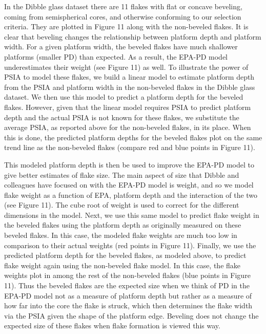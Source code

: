 \documentclass[10pt,letterpaper]{article}
\begin{document}
In the Dibble glass dataset there are 11 flakes with flat or concave
beveling, coming from semispherical cores, and otherwise conforming to
our selection criteria. They are plotted in Figure 11 along with the
non-beveled flakes. It is clear that beveling changes the relationship
between platform depth and platform width. For a given platform width,
the beveled flakes have much shallower platforms (smaller PD) than
expected. As a result, the EPA-PD model underestimates their weight (see
Figure 11) as well. To illustrate the power of PSIA to model these
flakes, we build a linear model to estimate platform depth from the PSIA
and platform width in the non-beveled flakes in the Dibble glass
dataset. We then use this model to predict a platform depth for the
beveled flakes. However, given that the linear model requires PSIA to
predict platform depth and the actual PSIA is not known for these
flakes, we substitute the average PSIA, as reported above for the
non-beveled flakes, in its place. When this is done, the predicted
platform depths for the beveled flakes plot on the same trend line as
the non-beveled flakes (compare red and blue points in Figure 11).

This modeled platform depth is then be used to improve the EPA-PD model
to give better estimates of flake size. The main aspect of size that
Dibble and colleagues have focused on with the EPA-PD model is weight,
and so we model flake weight as a function of EPA, platform depth and
the interaction of the two (see Figure 11). The cube root of weight is
used to correct for the different dimensions in the model. Next, we use
this same model to predict flake weight in the beveled flakes using the
platform depth as originally measured on these beveled flakes. In this
case, the modeled flake weights are much too low in comparison to their
actual weights (red points in Figure 11). Finally, we use the predicted
platform depth for the beveled flakes, as modeled above, to predict
flake weight again using the non-beveled flake model. In this case, the
flake weights plot in among the rest of the non-beveled flakes (blue
points in Figure 11). Thus the beveled flakes are the expected size when
we think of PD in the EPA-PD model not as a measure of platform depth
but rather as a measure of how far into the core the flake is struck,
which then determines the flake width via the PSIA given the shape of
the platform edge. Beveling does not change the expected size of these
flakes when flake formation is viewed this way.
\end{document}

